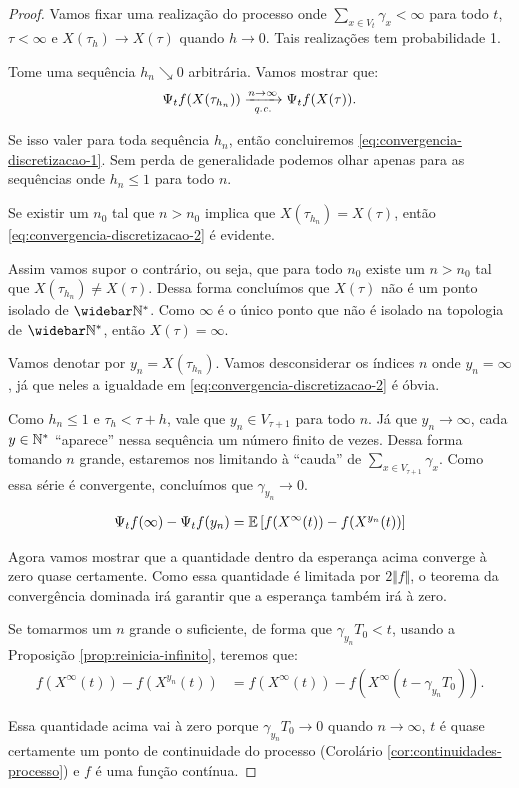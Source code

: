 \begin{proof}
  Vamos fixar uma realização do processo onde $\sum_{x \in V_t}
  \gamma_x < \infty$ para todo $t$, $\tau < \infty$ e $X(\tau_{h}) \to
  X(\tau)$ quando $h \to 0$. Tais realizações tem probabilidade 1.


  Tome uma sequência $h_n \searrow 0$ arbitrária. Vamos mostrar que:
  \begin{equation}
    \label{eq:convergencia-discretizacao-2}
    \Psi_t f (X(\tau_{h_n})) \xrightarrow[{\emph{q.c.}}]{n \to \infty}
    \Psi_t f(X(\tau)).
  \end{equation}

  Se isso valer para toda sequência $h_n$, então concluiremos
  \eqref{eq:convergencia-discretizacao-1}. Sem perda de generalidade
  podemos olhar apenas para as sequências onde $h_n \leq 1$ para todo
  $n$.

  Se existir um $n_0$ tal que $n > n_0$ implica que $X(\tau_{h_n}) =
  X(\tau)$, então \eqref{eq:convergencia-discretizacao-2} é evidente.

  Assim vamos supor o contrário, ou seja, que para todo $n_0$ existe
  um $n > n_0$ tal que $X(\tau_{h_n}) \neq X(\tau)$. Dessa forma
  concluímos que $X(\tau)$ não é um ponto isolado de $\Nzb$. Como
  $\infty$ é o único ponto que não é isolado na topologia de $\Nzb$,
  então $X(\tau) = \infty$.

  Vamos denotar por $y_n = X(\tau_{h_n})$. Vamos desconsiderar os
  índices $n$ onde $y_n = \infty$, já que neles a igualdade em
  \eqref{eq:convergencia-discretizacao-2} é óbvia.

  Como $h_n \leq 1$ e $\tau_h < \tau + h$, vale que $y_n \in V_{\tau +
    1}$ para todo $n$. Já que $y_n \to \infty$, cada $y \in {\mathbb{N^*}}$
  ``aparece'' nessa sequência um número finito de vezes.  Dessa forma
  tomando $n$ grande, estaremos nos limitando à ``cauda'' de $\sum_{x
    \in V_{\tau + 1}} \gamma_x$. Como essa série é convergente,
  concluímos que $\gamma_{y_n} \to 0$.

  \begin{align*}
    \Psi_t f(\infty) - \Psi_t f (y_n)
    = {\mathbb{E}} \left[
      f(X^{\infty}(t)) - f(X^{y_n}(t))
    \right]
  \end{align*}

  Agora vamos mostrar que a quantidade dentro da esperança acima
  converge à zero quase certamente. Como essa quantidade é limitada
  por $2 \Vert f \Vert$, o teorema da convergência dominada irá
  garantir que a esperança também irá à zero.

  Se tomarmos um $n$ grande o suficiente, de forma que $\gamma_{y_n}
  T_0 < t$, usando a Proposição \ref{prop:reinicia-infinito}, teremos
  que:
  \begin{align*}
    f(X^{\infty}(t)) - f(X^{y_n}(t)) &=
    f(X^{\infty}(t)) - f(X^{\infty}(t-\gamma_{y_n} T_0)).
  \end{align*}

  Essa quantidade acima vai à zero porque $\gamma_{y_n} T_0 \to 0$
  quando $n \to \infty$, $t$ é quase certamente um ponto de
  continuidade do processo (Corolário
  \ref{cor:continuidades-processo}) e $f$ é uma função contínua.
\end{proof}



